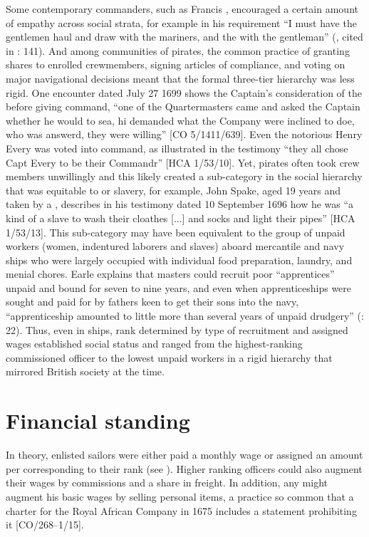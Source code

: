 Some contemporary commanders, such as Francis , encouraged a certain amount of empathy across social strata, for example in his requirement “I must have the gentlemen haul and draw with the mariners, and the  with the gentleman” (, cited in \citealt{Bicheno2012}: 141). And among communities of pirates, the common practice of granting shares to enrolled crewmembers, signing articles of compliance, and voting on major navigational decisions meant that the formal three-tier hierarchy was less rigid. One  encounter dated July 27 1699 shows the Captain’s consideration of the  before giving command, “one of the Quartermasters came and asked the Captain whether he would to sea, hi demanded what the Company were inclined to doe, who was answerd, they were willing” [CO 5/1411/639]. Even the notorious  Henry Every was voted into command, as illustrated in the testimony “they all chose Capt Every to be their Commandr” [HCA 1/53/10]. Yet, pirates often took crew members unwillingly and this likely created a sub-category in the social hierarchy that was equitable to  or slavery, for example, John Spake, aged 19 years and taken by a , describes in his testimony dated 10 September {1696} how he was “a kind of a slave to wash their cloathes [...] and socks and light their pipes” [HCA 1/53/13]. This sub-category may have been equivalent to the group of unpaid workers (women, indentured laborers and slaves) aboard mercantile and navy ships who were largely occupied with individual food preparation, laundry, and menial chores.  Earle explains that masters could recruit poor “apprentices” unpaid and bound for seven to nine years, and even when apprenticeships were sought and paid for by fathers keen to get their sons into the navy, “apprenticeship amounted to little more than several years of unpaid drudgery” (\citealt{Earle1998}: 22). Thus, even in  ships, rank determined by type of recruitment and assigned wages established social status and ranged from the highest-ranking commissioned officer to the lowest unpaid workers in a rigid hierarchy that mirrored British society at the time. 

\section{{Financial standing}}\label{sec:3.8}

In theory, enlisted sailors were either paid a monthly wage or assigned an amount per  corresponding to their rank (see ). Higher ranking officers could also augment their wages by commissions and a share in freight. In addition, any  might augment his basic wages by selling personal items, a practice so common that a charter for the Royal African Company in 1675 includes a statement prohibiting it [CO/268–1/15].  

